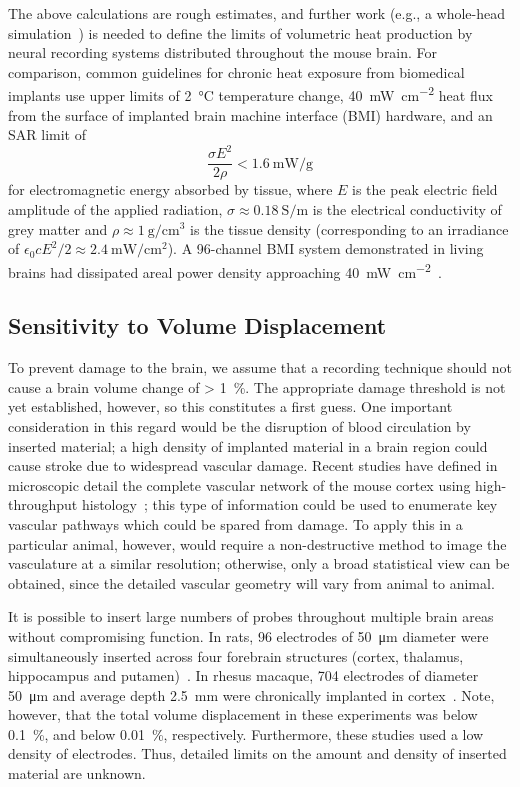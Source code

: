 The above calculations are rough estimates, and further work (e.g., a whole-head simulation~\cite{Lazzi2005}) is needed to define the limits of volumetric heat production by neural recording systems distributed throughout the mouse brain. For comparison, common guidelines for chronic heat exposure from biomedical implants \cite{Wolf2008} use upper limits of \SI{2}{\celsius} temperature change, \SI{40}{\milli\watt\per\centi\meter\squared} heat flux from the surface of implanted brain machine interface (BMI) hardware, and an SAR limit of \[\frac{\sigma E^2}{2 \rho} < \SI{1.6}{\milli\watt\per\gram}\] for electromagnetic energy absorbed by tissue, where $E$ is the peak electric field amplitude of the applied radiation, $\sigma \approx \SI{0.18}{\siemens\per\meter}$ is the electrical conductivity of grey matter and $\rho \approx \SI{1}{\gram\per\centi\meter\cubed}$ is the tissue density \cite{Lazzi2005} (corresponding to an irradiance of $\epsilon_0 c E^2 / 2 \approx \SI{2.4}{\milli\watt\per\centi\meter\squared}$). A 96-channel BMI system demonstrated in living brains had dissipated areal power density approaching \SI{40}{\milli\watt\per\centi\meter\squared}~\cite{rizk2009}.

\subsection{Sensitivity to Volume Displacement}

To prevent damage to the brain, we assume that a recording technique should not cause a brain volume change of \SI{> 1}{\percent}. The appropriate damage threshold is not yet established, however, so this constitutes a first guess. One important consideration in this regard would be the disruption of blood circulation by inserted material; a high density of implanted material in a brain region could cause stroke due to widespread vascular damage. Recent studies have defined in microscopic detail the complete vascular network of the mouse cortex using high-throughput histology~\cite{Kleinfeld2013}; this type of information could be used to enumerate key vascular pathways which could be spared from damage. To apply this in a particular animal, however, would require a non-destructive method to image the vasculature at a similar resolution; otherwise, only a broad statistical view can be obtained, since the detailed vascular geometry will vary from animal to animal.

It is possible to insert large numbers of probes throughout multiple brain areas without compromising function. In rats, 96 electrodes of \SI{50}{\micro\meter} diameter were simultaneously inserted across four forebrain structures (cortex, thalamus, hippocampus and putamen)~\cite{Ribeiro2004}. In rhesus macaque, 704 electrodes of diameter \SI{50}{\micro\meter} and average depth \SI{2.5}{\milli\meter} were chronically implanted in cortex~\cite{Nicolelis2003}. Note, however, that the total volume displacement in these experiments was below \SI{0.1}{\percent}, and below \SI{0.01}{\percent}, respectively.  Furthermore, these studies used a low density of electrodes. Thus, detailed limits on the amount and density of inserted material are unknown.


